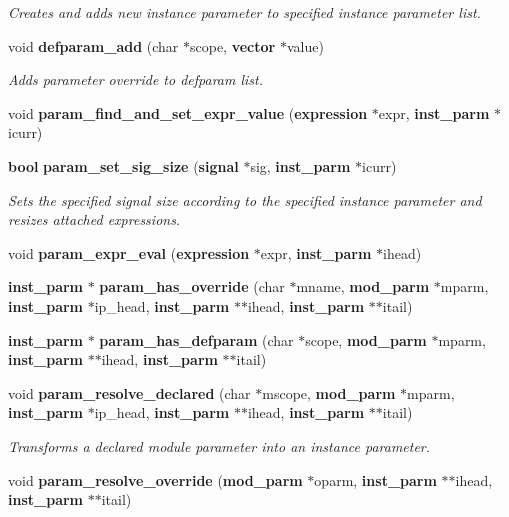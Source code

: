 \begin{CompactItemize}
\begin{CompactList}\small\item\em Creates and adds new instance parameter to specified instance parameter list.\item\end{CompactList}\item 
void {\bf defparam\_\-add} (char $\ast$scope, {\bf vector} $\ast$value)
\begin{CompactList}\small\item\em Adds parameter override to defparam list.\item\end{CompactList}\item 
void {\bf param\_\-find\_\-and\_\-set\_\-expr\_\-value} ({\bf expression} $\ast$expr, {\bf inst\_\-parm} $\ast$icurr)
\item 
{\bf bool} {\bf param\_\-set\_\-sig\_\-size} ({\bf signal} $\ast$sig, {\bf inst\_\-parm} $\ast$icurr)
\begin{CompactList}\small\item\em Sets the specified signal size according to the specified instance parameter and resizes attached expressions.\item\end{CompactList}\item 
void {\bf param\_\-expr\_\-eval} ({\bf expression} $\ast$expr, {\bf inst\_\-parm} $\ast$ihead)
\item 
{\bf inst\_\-parm} $\ast$ {\bf param\_\-has\_\-override} (char $\ast$mname, {\bf mod\_\-parm} $\ast$mparm, {\bf inst\_\-parm} $\ast$ip\_\-head, {\bf inst\_\-parm} $\ast$$\ast$ihead, {\bf inst\_\-parm} $\ast$$\ast$itail)
\item 
{\bf inst\_\-parm} $\ast$ {\bf param\_\-has\_\-defparam} (char $\ast$scope, {\bf mod\_\-parm} $\ast$mparm, {\bf inst\_\-parm} $\ast$$\ast$ihead, {\bf inst\_\-parm} $\ast$$\ast$itail)
\item 
void {\bf param\_\-resolve\_\-declared} (char $\ast$mscope, {\bf mod\_\-parm} $\ast$mparm, {\bf inst\_\-parm} $\ast$ip\_\-head, {\bf inst\_\-parm} $\ast$$\ast$ihead, {\bf inst\_\-parm} $\ast$$\ast$itail)
\begin{CompactList}\small\item\em Transforms a declared module parameter into an instance parameter.\item\end{CompactList}\item 
void {\bf param\_\-resolve\_\-override} ({\bf mod\_\-parm} $\ast$oparm, {\bf inst\_\-parm} $\ast$$\ast$ihead, {\bf inst\_\-parm} $\ast$$\ast$itail)

\end{CompactItemize}
